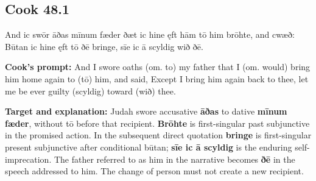 \par\begin{minipage}{\linewidth}\raggedright
\subsection*{Cook 48.1}

And ic swōr āðas mīnum fæder ðæt ic hine ęft hām tō him brōhte, and cwæð: Būtan ic hine ęft tō ðē bringe, sīe ic ā scyldig wið ðē.

\textbf{Cook’s prompt:} And I swore oaths (om. to) my father that I (om. would) bring him home again to (tō) him, and said, Except I bring him again back to thee, let me be ever guilty (scyldig) toward (wið) thee.

\textbf{Target and explanation:} Judah swore accusative \textbf{āðas} to dative \textbf{mīnum fæder}, without tō before that recipient. \textbf{Brōhte} is first-singular past subjunctive in the promised action. In the subsequent direct quotation \textbf{bringe} is first-singular present subjunctive after conditional būtan; \textbf{sīe ic ā scyldig} is the enduring self-imprecation. The father referred to as him in the narrative becomes \textbf{ðē} in the speech addressed to him. The change of person must not create a new recipient.

\end{minipage}\par\addvspace{4pt}

